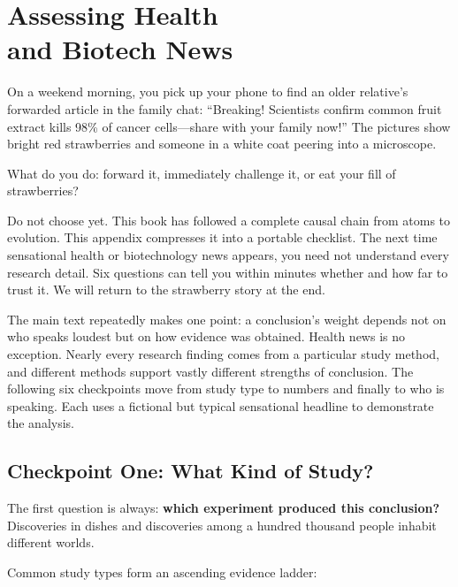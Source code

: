 \chapter[Assessing Health and Biotech News]{Assessing Health\protect\\ and Biotech News}

\begin{kaichang}
On a weekend morning, you pick up your phone to find an older relative's forwarded article in the family chat: ``Breaking! Scientists confirm common fruit extract kills 98\% of cancer cells---share with your family now!'' The pictures show bright red strawberries and someone in a white coat peering into a microscope.

What do you do: forward it, immediately challenge it, or eat your fill of strawberries?

Do not choose yet. This book has followed a complete causal chain from atoms to evolution. This appendix compresses it into a portable checklist. The next time sensational health or biotechnology news appears, you need not understand every research detail. Six questions can tell you within minutes whether and how far to trust it. We will return to the strawberry story at the end.
\end{kaichang}

The main text repeatedly makes one point: a conclusion's weight depends not on who speaks loudest but on how evidence was obtained. Health news is no exception. Nearly every research finding comes from a particular study method, and different methods support vastly different strengths of conclusion. The following six checkpoints move from study type to numbers and finally to who is speaking. Each uses a fictional but typical sensational headline to demonstrate the analysis.

\section{Checkpoint One: What Kind of Study?}

The first question is always: \textbf{which experiment produced this conclusion?} Discoveries in dishes and discoveries among a hundred thousand people inhabit different worlds.

Common study types form an ascending evidence ladder:

